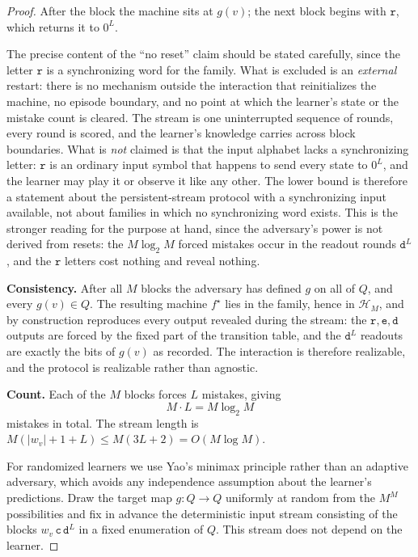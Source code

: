 \documentclass[12pt]{article}
\theoremstyle{definition}
\begin{document}
\begin{proof}
After the block the machine sits at $g(v)$; the next block begins with
$\mathtt r$, which returns it to $0^L$.

The precise content of the ``no reset'' claim should be stated carefully, since
the letter $\mathtt r$ is a synchronizing word for the family.  What is
excluded is an \emph{external} restart: there is no mechanism outside the
interaction that reinitializes the machine, no episode boundary, and no point
at which the learner's state or the mistake count is cleared.  The stream is
one uninterrupted sequence of rounds, every round is scored, and the learner's
knowledge carries across block boundaries.  What is \emph{not} claimed is that
the input alphabet lacks a synchronizing letter: $\mathtt r$ is an ordinary
input symbol that happens to send every state to $0^L$, and the learner may
play it or observe it like any other.  The lower bound is therefore a statement
about the persistent-stream protocol with a synchronizing input available, not
about families in which no synchronizing word exists.  This is the stronger
reading for the purpose at hand, since the adversary's power is not derived
from resets: the $M\log_2M$ forced mistakes occur in the readout rounds
$\mathtt d^{L}$, and the $\mathtt r$ letters cost nothing and reveal nothing.

\textbf{Consistency.}
After all $M$ blocks the adversary has defined $g$ on all of $Q$, and every
$g(v)\in Q$.  The resulting machine $f^\star$ lies in the family, hence in
$\mathcal H_M$, and by construction reproduces every output revealed during the
stream: the $\mathtt r,\mathtt e,\mathtt d$ outputs are forced by the fixed
part of the transition table, and the $\mathtt d^L$ readouts are exactly the
bits of $g(v)$ as recorded.  The interaction is therefore realizable, and the
protocol is realizable rather than agnostic.

\textbf{Count.}
Each of the $M$ blocks forces $L$ mistakes, giving
\[
M\cdot L
=
M\log_2 M
\]
mistakes in total.  The stream length is
$M(|w_v|+1+L)\le M(3L+2)=O(M\log M)$.

For randomized learners we use Yao's minimax principle rather than an adaptive
adversary, which avoids any independence assumption about the learner's
predictions.  Draw the target map $g:Q\to Q$ uniformly at random from the
$M^M$ possibilities and fix in advance the deterministic input stream
consisting of the blocks $w_v\,\mathtt c\,\mathtt d^L$ in a fixed enumeration
of $Q$.  This stream does not depend on the learner.


\end{proof}
\end{document}
